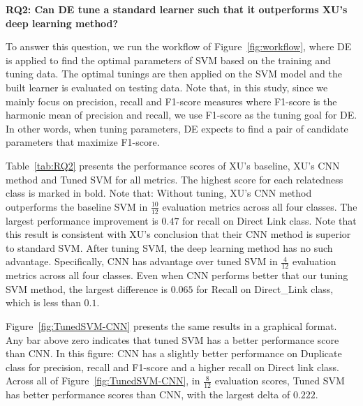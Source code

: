\documentclass[sigconf]{acmart}
\theoremstyle{break}
\newcommand{\fig}[1]{Figure~\ref{fig:#1}}
\newcommand{\tab}[1]{Table~\ref{tab:#1}}
\begin{document}
 


 
\textbf{RQ2: Can DE tune a standard learner such that it outperforms XU's deep learning method?}

To answer this question, we run the workflow of \fig{workflow}, where DE is applied to 
find the optimal parameters of SVM based on the training and tuning data. The optimal tunings are then applied on the SVM model and  the built learner is evaluated on testing data. Note that, in this study,
since we mainly focus on {precision}, {recall} and {F1-score} measures where {F1-score} is the
harmonic mean of {precision} and {recall}, we use {F1-score} as the tuning goal for DE.
In other words, when tuning parameters,  DE expects to find a pair of candidate parameters that maximize
 F1-score. 


\tab{RQ2} presents the performance scores of  XU's baseline, XU's CNN method and Tuned SVM 
for all metrics. The highest score for each relatedness class
  is marked in bold.  Note that: Without tuning, XU's CNN method outperforms
the baseline SVM in $\frac{10}{12}$ evaluation metrics across all four classes. 
The largest performance improvement is $0.47$ for {recall} on {Direct Link} class. Note that this result is consistent with XU's conclusion
that their CNN method is superior to standard SVM.
After tuning SVM, the deep learning method has no such advantage. Specifically, CNN has advantage over tuned SVM in $\frac{4}{12}$ evaluation metrics across all four classes. Even when CNN performs better that our tuning SVM method,
the largest difference is $0.065$ for Recall on Direct\_Link class, which is less than $0.1$. 

\fig{TunedSVM-CNN} presents the same results in a graphical format.
Any bar above zero indicates that tuned SVM has
a better performance score than CNN.
In this figure: CNN has a slightly better performance on
{Duplicate} class for {precision}, {recall} and {F1-score} and
a higher {recall} on {Direct link} class.  Across all of \fig{TunedSVM-CNN},
in $\frac{8}{12}$ evaluation scores, Tuned SVM has better performance scores than CNN, with the largest delta of $0.222$.

\end{document}
